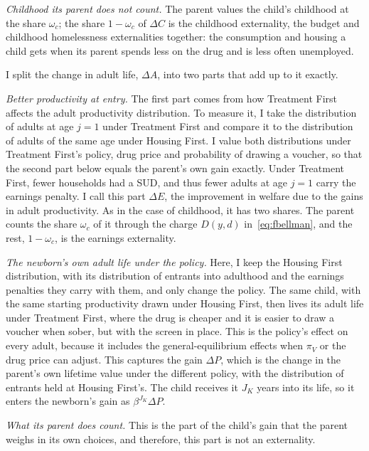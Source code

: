 \documentclass[10pt]{article}
\begin{document}
\emph{Childhood its parent does not count.} The parent values the child's childhood at the share $\omega_c$; the share $1-\omega_c$ of $\Delta C$ is the childhood externality, the budget and childhood homelessness externalities together: the consumption and housing a child gets when its parent spends less on the drug and is less often unemployed.

I split the change in adult life, $\Delta A$, into two parts that add up to it exactly.

\emph{Better productivity at entry.}   The first part comes from how Treatment First affects the adult productivity distribution. To measure it, I take the distribution of adults at age $j=1$ under Treatment First and compare it to the distribution of adults of the same age under Housing First. I value both distributions under Treatment First's policy, drug price and probability of drawing a voucher, so that the second part below equals the parent's own gain exactly. Under Treatment First, fewer households had a SUD, and thus fewer adults at age $j=1$ carry the earnings penalty. I call this part $\Delta E$, the improvement in welfare due to the gains in adult productivity.  As in the case of childhood, it has two shares. The parent counts the share $\omega_c$ of it through the charge $D(y,d)$ in~\eqref{eq:fbellman}, and the rest, $1-\omega_c$, is the earnings externality.

\emph{The newborn's own adult life under the policy.}   Here, I keep the Housing First distribution, with its distribution of entrants into adulthood and the earnings penalties they carry with them, and only change the policy. The same child, with the same starting productivity drawn under Housing First, then lives its adult life under Treatment First, where the drug is cheaper and it is easier to draw a voucher when sober, but with the screen in place. This is the policy's effect on every adult, because it includes the general-equilibrium effects when $\pi_V$ or the drug price can adjust. This captures the gain $\Delta P$, which is the change in the parent's own lifetime value under the different policy, with the distribution of entrants held at Housing First's. The child receives it $J_K$ years into its life, so it enters the newborn's gain as $\beta^{J_K}\Delta P$. 

\emph{What its parent does count.}   This is the part of the child's gain that the parent weighs in its own choices, and therefore, this part is not an externality.
\end{document}
